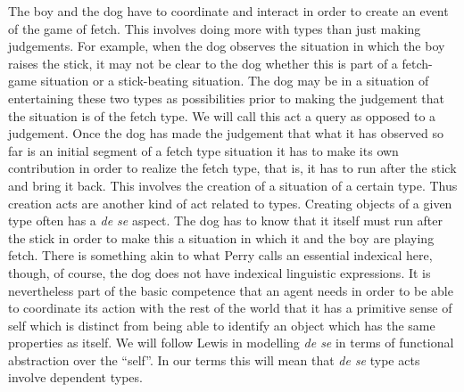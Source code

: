 The boy and the dog have to coordinate and interact in order to create an
event of the game of fetch.  This involves doing more with types than
just making judgements.  For example, when the dog observes the
situation in which the boy raises the stick, it may not be clear
to the dog whether this is part of a fetch-game situation or a
stick-beating situation.  The dog may be in a situation of
entertaining these two types as possibilities prior to making the
judgement that the situation is of the fetch type.  We will call this
act a query as opposed to a judgement.  Once the dog has made the
judgement that what it has observed so far is an initial segment of a
fetch type situation it has to make its own contribution in order to
realize the fetch type, that is, it has to run after the stick and
bring it back.  This involves the creation of a situation of a certain
type.  Thus creation acts are another kind of act related to types.
Creating objects of a given type often has a \textit{de se}
\citep[see, for example,][]{Perry1979,Lewis1979a,Ninan2010,Schlenker2011} aspect.  The dog
has to know that it itself must run after the stick in order to make
this a situation in which it and the boy are playing fetch.  There is
something akin to what Perry calls an essential indexical here,
though, of course, the dog does not have indexical linguistic
expressions. It is nevertheless part of the basic competence that an
agent needs in order to be able to coordinate its action with the rest
of the world that it has a primitive sense of self which is distinct
from being able to identify an object which has the same properties as
itself.  We will follow Lewis in modelling \textit{de se} in terms of
functional abstraction over the ``self''.  In our terms this will mean
that \textit{de se} type acts involve dependent types.

